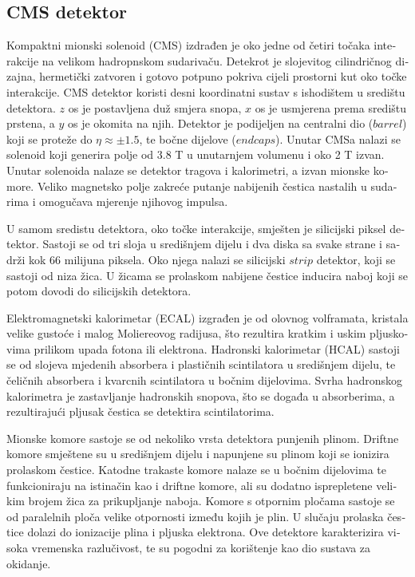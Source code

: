 \begin{otherlanguage}{croatian}
 
\section{CMS detektor}
Kompaktni mionski solenoid (CMS) izdrađen je oko jedne od četiri točaka interakcije na velikom hadropnskom sudarivaču. Detekrot je slojevitog cilindričnog dizajna, hermetički zatvoren i gotovo potpuno pokriva cijeli prostorni kut oko točke interakcije. CMS detektor koristi desni koordinatni sustav s ishodištem u središtu detektora. $z$ os je postavljena duž smjera snopa, $x$ os je usmjerena prema središtu prstena, a $y$ os je okomita na njih. Detektor je podijeljen na centralni dio ($barrel$) koji se proteže do $\eta \approx \pm 1.5$, te bočne dijelove ($endcaps$). Unutar CMSa nalazi se solenoid koji generira polje od 3.8 T u unutarnjem volumenu i oko 2 T izvan.  Unutar solenoida nalaze se detektor tragova i kalorimetri, a izvan mionske komore. Veliko magnetsko polje zakreće putanje nabijenih čestica nastalih u sudarima i omogučava mjerenje njihovog impulsa. 
\par U samom sredistu detektora, oko točke interakcije, smješten je silicijski piksel detektor. Sastoji se od tri sloja u središnjem dijelu i dva diska sa svake strane i sadrži kok 66 milijuna piksela. Oko njega nalazi se silicijski $strip$ detektor, koji se sastoji od niza žica. U žicama se prolaskom nabijene čestice inducira naboj koji se potom dovodi do silicijskih detektora. 
\par Elektromagnetski kalorimetar (ECAL) izgrađen je od olovnog volframata, kristala velike gustoće i malog Moliereovog radijusa, što rezultira kratkim i uskim pljuskovima prilikom upada fotona ili elektrona. Hadronski kalorimetar (HCAL) sastoji se od slojeva mjedenih absorbera i plastičnih scintilatora u središnjem dijelu, te čeličnih absorbera i kvarcnih scintilatora u bočnim dijelovima. Svrha hadronskog kalorimetra je zastavljanje hadronskih snopova, što se događa u absorberima, a rezultirajući pljusak čestica se detektira scintilatorima. 
\par Mionske komore sastoje se od nekoliko vrsta detektora punjenih plinom. Driftne komore smještene su u središnjem dijelu i napunjene su plinom koji se ionizira prolaskom čestice. Katodne trakaste komore nalaze se u bočnim dijelovima te funkcioniraju na istinačin kao i driftne komore, ali su dodatno isprepletene velikim brojem žica za prikupljanje naboja. Komore s otpornim pločama sastoje se od paralelnih ploča velike otpornosti između kojih je plin. U slučaju prolaska čestice dolazi do ionizacije plina i pljuska elektrona. Ove detektore karakterizira visoka vremenska razlučivost, te su pogodni za korištenje kao dio sustava za okidanje. 

\end{otherlanguage}
